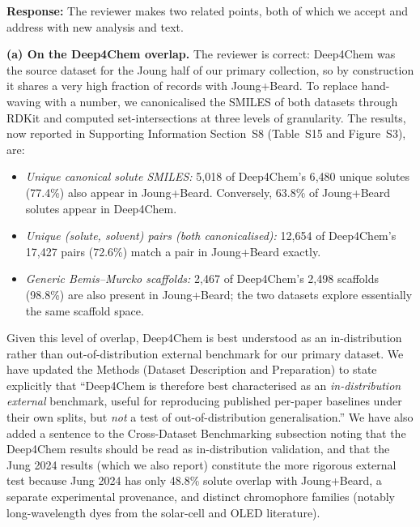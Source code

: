 \documentclass[11pt]{article}
\newcommand{\response}[1]{\noindent\textbf{Response:} #1\par\medskip}
\begin{document}
\response{The reviewer makes two related points, both of which we accept and address with new analysis and text.

\textbf{(a) On the Deep4Chem overlap.} The reviewer is correct: Deep4Chem was the source dataset for the Joung half of our primary collection, so by construction it shares a very high fraction of records with Joung+Beard. To replace hand-waving with a number, we canonicalised the SMILES of both datasets through RDKit and computed set-intersections at three levels of granularity. The results, now reported in Supporting Information Section~S8 (Table~S15 and Figure~S3), are:
\begin{itemize}[leftmargin=2em,itemsep=2pt]
  \item \emph{Unique canonical solute SMILES:} 5{,}018 of Deep4Chem's 6{,}480 unique solutes (77.4\%) also appear in Joung+Beard. Conversely, 63.8\% of Joung+Beard solutes appear in Deep4Chem.
  \item \emph{Unique (solute, solvent) pairs (both canonicalised):} 12{,}654 of Deep4Chem's 17{,}427 pairs (72.6\%) match a pair in Joung+Beard exactly.
  \item \emph{Generic Bemis--Murcko scaffolds:} 2{,}467 of Deep4Chem's 2{,}498 scaffolds (98.8\%) are also present in Joung+Beard; the two datasets explore essentially the same scaffold space.
\end{itemize}
Given this level of overlap, Deep4Chem is best understood as an in-distribution rather than out-of-distribution external benchmark for our primary dataset. We have updated the Methods (Dataset Description and Preparation) to state explicitly that ``Deep4Chem is therefore best characterised as an \emph{in-distribution external} benchmark, useful for reproducing published per-paper baselines under their own splits, but \emph{not} a test of out-of-distribution generalisation.'' We have also added a sentence to the Cross-Dataset Benchmarking subsection noting that the Deep4Chem results should be read as in-distribution validation, and that the Jung 2024 results (which we also report) constitute the more rigorous external test because Jung 2024 has only 48.8\% solute overlap with Joung+Beard, a separate experimental provenance, and distinct chromophore families (notably long-wavelength dyes from the solar-cell and OLED literature).

}
\end{document}
